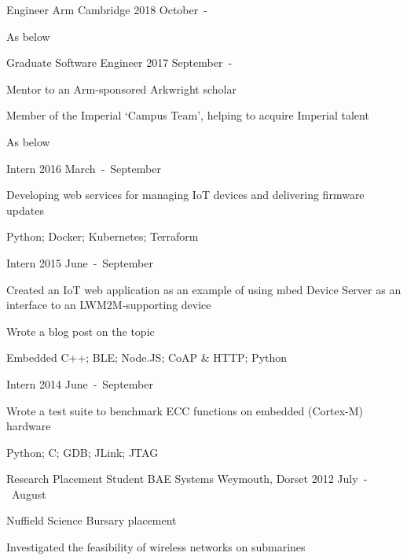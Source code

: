 \begin{cventries}

\cventry
  {Engineer}
  {Arm}
  {Cambridge}
  {2018 October~-}
  {\begin{cvitems}
    \item {As below}
  \end{cvitems}}

\cventryprevrole
  {Graduate Software Engineer}
  {2017 September~-}
  {\begin{cvitems}
    \item {Mentor to an Arm-sponsored Arkwright scholar}
    \item {Member of the Imperial `Campus Team', helping to acquire Imperial talent}
    \item {As below}
  \end{cvitems}}

\cventryprevrole
  {Intern}
  {2016 March~-~September}
  {\begin{cvitems}
    \item {Developing web services for managing IoT devices and delivering firmware updates}
    \item {Python; Docker; Kubernetes; Terraform}
  \end{cvitems}}

\cventryprevrole
  {Intern}
  {2015 June~-~September}
  {\begin{cvitems}
    \item {Created an IoT web application as an example of using mbed Device Server as an interface to an LWM2M-supporting device}
    \item {Wrote a blog post on the topic}
    \item {Embedded C++; BLE; Node.JS; CoAP \& HTTP; Python}
  \end{cvitems}}

\cventryprevrole
  {Intern}
  {2014 June~-~September}
  {\begin{cvitems}
    \item {Wrote a test suite to benchmark ECC functions on embedded (Cortex-M) hardware}
    \item {Python; C; GDB; JLink; JTAG}
  \end{cvitems}}

\cventry
  {Research Placement Student}
  {BAE Systems}
  {Weymouth, Dorset}
  {2012 July~-~August}
  {\begin{cvitems}
    \item {Nuffield Science Bursary placement}
    \item {Investigated the feasibility of wireless networks on submarines}
  \end{cvitems}}

\end{cventries}
